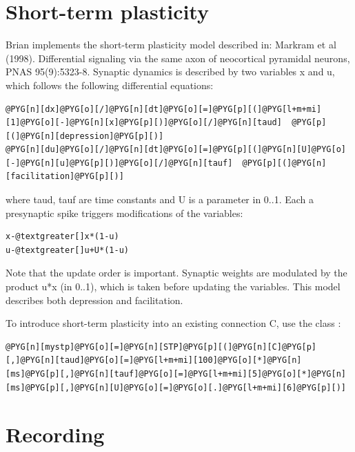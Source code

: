 \documentclass[letterpaper,10pt,english]{manual}
\begin{document}
\resetcurrentobjects
\hypertarget{--doc-stp}{}

\section{Short-term plasticity}

Brian implements the short-term plasticity model described in:
Markram et al (1998). Differential signaling via the same axon of neocortical
pyramidal neurons, PNAS 95(9):5323-8.
Synaptic dynamics is described by two variables x and u, which
follows the following differential equations:

\begin{Verbatim}[commandchars=@\[\]]
@PYG[n][dx]@PYG[o][/]@PYG[n][dt]@PYG[o][=]@PYG[p][(]@PYG[l+m+mi][1]@PYG[o][-]@PYG[n][x]@PYG[p][)]@PYG[o][/]@PYG[n][taud]  @PYG[p][(]@PYG[n][depression]@PYG[p][)]
@PYG[n][du]@PYG[o][/]@PYG[n][dt]@PYG[o][=]@PYG[p][(]@PYG[n][U]@PYG[o][-]@PYG[n][u]@PYG[p][)]@PYG[o][/]@PYG[n][tauf]  @PYG[p][(]@PYG[n][facilitation]@PYG[p][)]
\end{Verbatim}

where taud, tauf are time constants and U is a parameter in 0..1.
Each a presynaptic spike triggers modifications of the variables:

\begin{Verbatim}[commandchars=@\[\]]
x-@textgreater[]x*(1-u)
u-@textgreater[]u+U*(1-u)
\end{Verbatim}

Note that the update order is important.
Synaptic weights are modulated by the product u*x (in 0..1), which is taken
before updating the variables. This model describes both depression and
facilitation.

To introduce short-term plasticity into an existing connection C, use the class
\hyperlink{brian.STP}{}:

\begin{Verbatim}[commandchars=@\[\]]
@PYG[n][mystp]@PYG[o][=]@PYG[n][STP]@PYG[p][(]@PYG[n][C]@PYG[p][,]@PYG[n][taud]@PYG[o][=]@PYG[l+m+mi][100]@PYG[o][*]@PYG[n][ms]@PYG[p][,]@PYG[n][tauf]@PYG[o][=]@PYG[l+m+mi][5]@PYG[o][*]@PYG[n][ms]@PYG[p][,]@PYG[n][U]@PYG[o][=]@PYG[o][.]@PYG[l+m+mi][6]@PYG[p][)]
\end{Verbatim}

\resetcurrentobjects
\hypertarget{--doc-recording}{}

\section{Recording}
\end{document}
